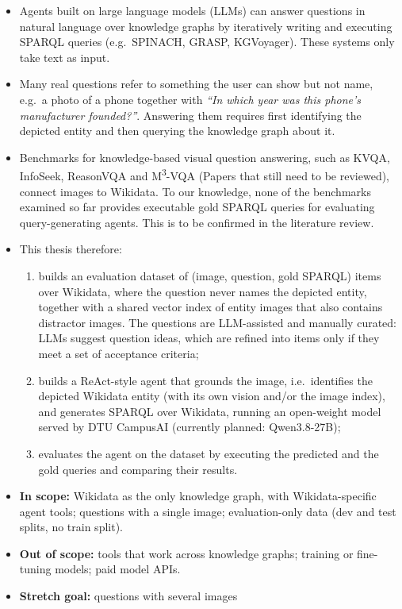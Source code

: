 \documentclass[a4paper,11pt]{article}
\begin{document}
\begin{itemize}
  \item Agents built on large language models (LLMs) can answer
    questions in natural language over knowledge graphs by iteratively writing
    and executing SPARQL queries (e.g.\ SPINACH, GRASP, KGVoyager). These
    systems only take text as input.
  \item Many real questions refer to something the user can show but not
    name, e.g.\ a photo of a phone together with \emph{``In which year was
    this phone's manufacturer founded?''}. Answering them requires first
    identifying the depicted entity and then querying the knowledge graph
    about it.
  \item Benchmarks for knowledge-based visual question answering, such as
    KVQA, InfoSeek, ReasonVQA and M\textsuperscript{3}-VQA (Papers
    that still need to be reviewed), connect images to
    Wikidata. To our knowledge, none of the benchmarks examined so
    far provides executable gold SPARQL
    queries for evaluating query-generating agents. This is to be confirmed
    in the literature review.
  \item This thesis therefore:
    \begin{enumerate}
      \item builds an evaluation dataset of (image, question, gold SPARQL)
        items over Wikidata, where the question never names the depicted
        entity, together with a shared vector index of entity images that
        also contains distractor images. The questions are LLM-assisted and
        manually curated: LLMs suggest question ideas, which are refined into
        items only if they meet a set of acceptance criteria;
      \item builds a ReAct-style agent that grounds the image, i.e.\
        identifies the depicted Wikidata entity (with its own vision and/or
        the image index), and generates SPARQL over Wikidata, running an
        open-weight model served by DTU CampusAI (currently planned:
        Qwen3.8-27B);
      \item evaluates the agent on the dataset by executing the predicted
        and the gold queries and comparing their results.
    \end{enumerate}
  \item \textbf{In scope:} Wikidata as the only knowledge graph, with
    Wikidata-specific agent tools; questions with a single image;
    evaluation-only data (dev and test splits, no train split).
  \item \textbf{Out of scope:} tools that work across knowledge graphs;
    training or fine-tuning models; paid model APIs.
  \item \textbf{Stretch goal:} questions with several images
\end{itemize}
\end{document}
